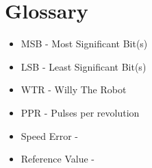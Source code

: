 \section{Glossary}
\begin{itemize}
\item \label{trm::MSB} MSB  - Most Significant Bit(s)
\item \label{trm::LSB} LSB  - Least Significant Bit(s)
\item \label{trm::WTR} WTR  - Willy The Robot
\item \label{trm::PPR} PPR - Pulses per revolution
\item \label{trm::speederror} Speed Error -  
\item \label{trm::refturn} Reference Value - 
\end{itemize}